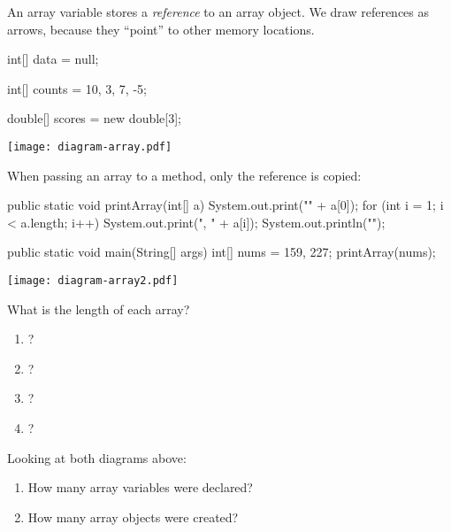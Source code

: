 
An array variable stores a \emph{reference} to an array object.
We draw references as arrows, because they ``point'' to other memory locations.

\medskip
\begin{javalst}
    int[] data = null;


    int[] counts = {10, 3, 7, -5};


    double[] scores = new double[3];
\end{javalst}

\vspace{-9.75em}
\hfill \texttt{[image: diagram-array.pdf]}
\hspace{2em} \null

\vspace{1.25em}
When passing an array to a method, only the reference is copied:

\medskip
\begin{javalst}
public static void printArray(int[] a) {
    System.out.print("{" + a[0]);
    for (int i = 1; i < a.length; i++) {
        System.out.print(", " + a[i]);
    }
    System.out.println("}");
}

public static void main(String[] args) {
    int[] nums = {159, 227};
    printArray(nums);
}
\end{javalst}

\vspace{-14em}
\hfill \texttt{[image: diagram-array2.pdf]}
\vspace{2em}




\Q What is the length of each array?

\begin{multicols}{2}
\begin{enumerate}
\item {}? 
\item {}? 
\item {}?   
\item {}?      
\end{enumerate}
\end{multicols}


\Q Looking at both diagrams above:

\begin{enumerate}
\item How many array variables were declared? 
\item How many array objects were created? 
\end{enumerate}


